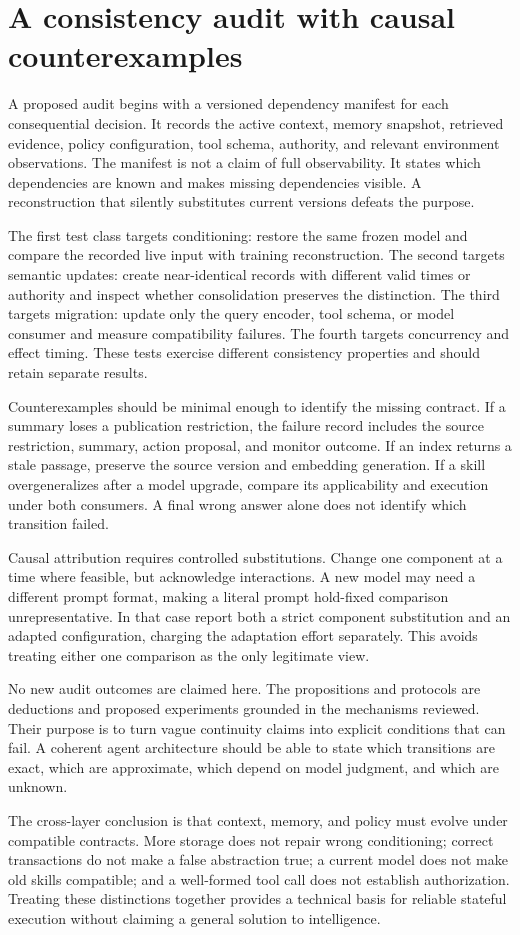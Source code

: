 \section{A consistency audit with causal counterexamples}\label{sec:C17:audit}
A proposed audit begins with a versioned dependency manifest for each consequential decision. It records the active context, memory snapshot, retrieved evidence, policy configuration, tool schema, authority, and relevant environment observations. The manifest is not a claim of full observability. It states which dependencies are known and makes missing dependencies visible. A reconstruction that silently substitutes current versions defeats the purpose.

The first test class targets conditioning: restore the same frozen model and compare the recorded live input with training reconstruction. The second targets semantic updates: create near-identical records with different valid times or authority and inspect whether consolidation preserves the distinction. The third targets migration: update only the query encoder, tool schema, or model consumer and measure compatibility failures. The fourth targets concurrency and effect timing. These tests exercise different consistency properties and should retain separate results.

Counterexamples should be minimal enough to identify the missing contract. If a summary loses a publication restriction, the failure record includes the source restriction, summary, action proposal, and monitor outcome. If an index returns a stale passage, preserve the source version and embedding generation. If a skill overgeneralizes after a model upgrade, compare its applicability and execution under both consumers. A final wrong answer alone does not identify which transition failed.

Causal attribution requires controlled substitutions. Change one component at a time where feasible, but acknowledge interactions. A new model may need a different prompt format, making a literal prompt hold-fixed comparison unrepresentative. In that case report both a strict component substitution and an adapted configuration, charging the adaptation effort separately. This avoids treating either one comparison as the only legitimate view.

No new audit outcomes are claimed here. The propositions and protocols are deductions and proposed experiments grounded in the mechanisms reviewed. Their purpose is to turn vague continuity claims into explicit conditions that can fail. A coherent agent architecture should be able to state which transitions are exact, which are approximate, which depend on model judgment, and which are unknown.

The cross-layer conclusion is that context, memory, and policy must evolve under compatible contracts. More storage does not repair wrong conditioning; correct transactions do not make a false abstraction true; a current model does not make old skills compatible; and a well-formed tool call does not establish authorization. Treating these distinctions together provides a technical basis for reliable stateful execution without claiming a general solution to intelligence.
